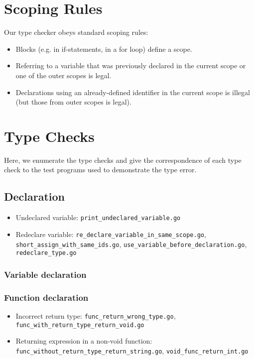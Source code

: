 \documentclass{article}
\begin{document}
\section*{Scoping Rules}

Our type checker obeys standard scoping rules:

\begin{itemize}
    \item Blocks (e.g. in if-statements, in a for loop) define a scope.
    \item Referring to a variable that was previously declared in the current scope or one of the outer scopes is legal.
    \item Declarations using an already-defined identifier in the current scope is illegal (but those from outer scopes is legal).
\end{itemize}

\section*{Type Checks}

Here, we enumerate the type checks and give the correspondence of each type check to the test programs used to demonstrate the type error.

\subsection*{Declaration}

\begin{itemize}
\item Undeclared variable: \texttt{print_undeclared_variable.go}
\item Redeclare variable: \texttt{re_declare_variable_in_same_scope.go}, \texttt{short_assign_with_same_ids.go}, \texttt{use_variable_before_declaration.go}, \texttt{redeclare_type.go}
\end{itemize}

\subsubsection*{Variable declaration}

\subsubsection*{Function declaration}

\begin{itemize}
\item Incorrect return type: \texttt{func_return_wrong_type.go}, \texttt{func_with_return_type_return_void.go}
\item Returning expression in a non-void function: \texttt{func_without_return_type_return_string.go}, \texttt{void_func_return_int.go}
\end{itemize}
\end{document}

